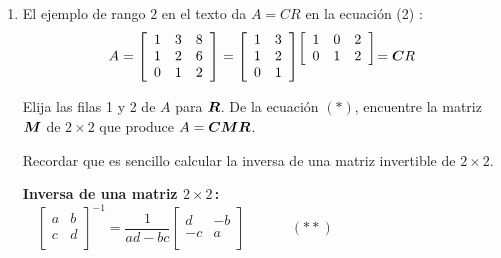 \documentclass[12pt,a4paper]{article}
\newcommand{\bi}[1]{\hbox{\boldmath$#1$}}
\newcommand\1{\mbox{\,\vrule height-0.8pt depth1.0pt width2pc\,}}
\newcommand\2{\mbox{\,\vrule height-0.8pt depth1.0pt width1pc\,}}
\begin{document}
\begin{enumerate}
\item El ejemplo de rango $2$ en el texto da $A=CR$ en la ecuación (2) :
$$
A=\left[\begin{array}{ccc}1&3&8\\1&2&6\\0&1&2\\\end{array}\right]=\left[\begin{array}{cc}1&3\\1&2\\0&1\\\end{array}\right]\begin{array}{@{\!}l@{\!}}\left[\begin{array}{ccc}1&0&2\\0&1&2\\\end{array}\right]\\\\\end{array}=\bi{C}R
$$

Elija las filas 1 y 2 de $A$ para $\bi{R}$. De la ecuación $(*)$, encuentre la matriz $\bi{M}$ de $2\times 2$ que produce $A= \bi{C} \bi{M} \bi{R}$.

Recordar que es sencillo calcular la inversa de una matriz invertible de $2\times 2$.

\textbf{Inversa de una matriz $2\times 2$\,:} $\quad\left[\begin{array}{rr}a&b\\c&d\\\end{array}\right]^{-1}=\dfrac{1}{ad-bc}\left[\begin{array}{rr}d&-b\\-c&a\\\end{array}\right]\hspace{39pt}(\ast\ast)$



\end{enumerate}
\end{document}
